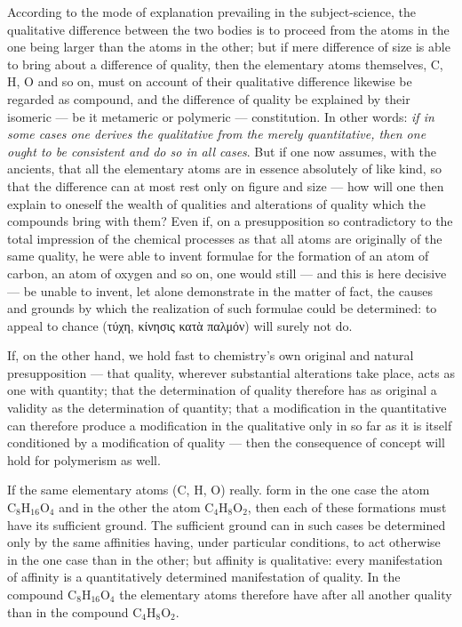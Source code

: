 \documentclass[12pt,a4paper]{book}
\begin{document}
According to the mode of explanation prevailing in the subject-science, the
qualitative difference between the two bodies is to proceed from the atoms in
the one being larger than the atoms in the other; but if mere difference of
size is able to bring about a difference of quality, then the elementary atoms
themselves, $\mathrm{C}$, $\mathrm{H}$, $\mathrm{O}$
and so on, must on account of their qualitative difference likewise be regarded
as compound, and the difference of quality be explained by their isomeric ---
be it metameric or polymeric --- constitution. In other words: \emph{if in some
cases one derives the qualitative from the merely quantitative, then one ought
to be consistent and do so in all cases}. But if one now assumes, with the
ancients, that all the elementary atoms are in essence absolutely of like kind,
so that the difference can at most rest only on figure and size --- how will
one then explain to oneself the wealth of qualities and alterations of quality
which the compounds bring with them? Even if, on a presupposition so
contradictory to the total impression of the chemical processes as that all
atoms are originally of the same quality, he were able to invent formulae for
the formation of an atom of carbon, an atom of oxygen and so on, one would
still --- and this is here decisive --- be unable to invent, let alone
demonstrate in the matter of fact, the causes and grounds by which the
realization of such formulae could be determined: to appeal to chance
(τύχη, κίνησις κατὰ παλμόν) will surely not do.

If, on the other hand, we hold fast to chemistry's own original and natural
presupposition --- that quality, wherever substantial alterations take place,
acts as one with quantity; that the determination of quality therefore has as
original a validity as the determination of quantity; that a modification in
the quantitative can therefore produce a modification in the qualitative only
in so far as it is itself conditioned by a modification of quality --- then the
consequence of concept will hold for polymerism as well.

If the same elementary atoms ($\mathrm{C}$, $\mathrm{H}$, $\mathrm{O}$) really.
form in
the one case the atom $\mathrm{C}_8\mathrm{H}_{16}\mathrm{O}_4$ and in the
other the atom $\mathrm{C}_4\mathrm{H}_8\mathrm{O}_2$, then each of these
formations must have its sufficient ground. The sufficient ground can in such
cases be determined only by the same affinities having, under particular
conditions, to act otherwise in the one case than in the other; but affinity is
qualitative: every manifestation of affinity is a quantitatively determined
manifestation of quality. In the compound
$\mathrm{C}_8\mathrm{H}_{16}\mathrm{O}_4$ the elementary atoms therefore have
after all another quality than in the compound
$\mathrm{C}_4\mathrm{H}_8\mathrm{O}_2$.
\end{document}
